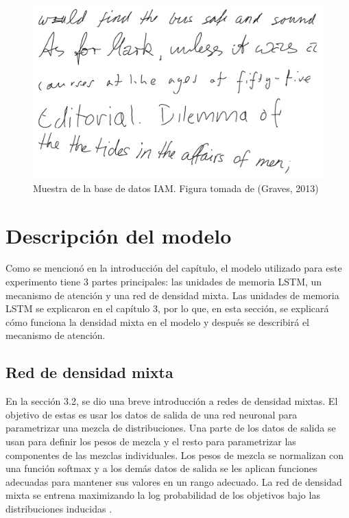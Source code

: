 \begin{figure}[h]
\begin{center}
\includegraphics[width=150mm, scale = 0.8]{./imag/iam.png}
\end{center}
\caption{Muestra de la base de datos IAM. Figura tomada de (Graves, 2013) }
\end{figure}

\section{Descripción del modelo}
Como se mencionó en la introducción del capítulo, el modelo utilizado para este experimento tiene 3 partes principales: las unidades de memoria LSTM, un mecanismo de atención y una red de densidad mixta. Las unidades de memoria LSTM se explicaron en el capítulo 3, por lo que, en esta sección, se explicará cómo funciona la densidad mixta en el modelo y después se describirá el mecanismo de atención. 

\subsection{Red de densidad mixta}
En la sección 3.2, se dio una breve introducción a redes de densidad mixtas. El objetivo de estas es usar los datos de salida de una red neuronal para parametrizar una mezcla de distribuciones. Una parte de los datos de salida se usan para definir los pesos de mezcla y el resto para parametrizar las componentes de las mezclas individuales. Los pesos de mezcla se normalizan con una función softmax y a los demás datos de salida se les aplican funciones adecuadas para mantener sus valores en un rango adecuado. La red de densidad mixta se entrena maximizando la log probabilidad de los objetivos bajo las distribuciones inducidas \cite{DBLP:journals/corr/Graves13}.

